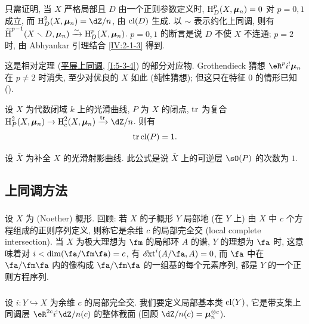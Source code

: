 只需证明, 当 $X$ 严格局部且 $D$ 由一个正则参数定义时,
$\operatorname{H}_D^p(X,{\bm\mu}_n) = 0$ 对 $p=0,1$ 成立,
而 $\h_D^2(X,\dmu_n) = \dZ/n$, 由 $\operatorname{cl}(D)$ 生成.
以 $\sim$ 表示约化上同调, 则有
$\widetilde{\operatorname{H}}^{p-1}(X\smallsetminus D,{\bm\mu}_n)\xrightarrow\sim \operatorname{H}_D^p(X,{\bm\mu}_n)$.
$p=0,1$ 的断言是说 $D$ 不使 $X$ 不连通; $p=2$ 时, 由 Abhyankar 引理结合 \ref{IV:2-1-3} 得到.

这是相对定理 (\hyperref[I]{平展上同调}, \ref{I:5-3-4}) 的部分对应物.
Grothendieck 猜想 $\eR^p i^! \dmu_n$ 在 $p\ne 2$ 时消失,
至少对优良的 $X$ 如此 (纯性猜想); 但这只在特征 $0$ 的情形已知 (\cite[XIX]{sga4}).

\begin{theorem}[基本相容性]\label{IV:2-1-5}
设 $X$ 为代数闭域 $k$ 上的光滑曲线, $P$ 为 $X$ 的闭点,
$\operatorname{tr}$ 为复合 $\h_P^2(X,\dmu_n) \to \h_c^2(X,\dmu_n) \xrightarrow{\tr} \dZ/n$. 则有
\[
  \operatorname{tr} \operatorname{cl}(P) = 1 \text{.}
\]
\end{theorem}

设 $\bar X$ 为补全 $X$ 的光滑射影曲线. 此公式是说 $\bar X$ 上的可逆层 $\sO(P)$ 的次数为 $1$.

\subsection{上同调方法}\label{IV:2-2}

\subsubsection{}\label{IV:2-2-1}

设 $X$ 为 (Noether) 概形. 回顾: 若 $X$ 的子概形 $Y$ 局部地 (在 $Y$ 上)
由 $X$ 中 $c$ 个方程组成的正则序列定义, 则称它是余维 $c$ 的局部完全交 (local complete intersection).
当 $X$ 为极大理想为 $\fm$ 的局部环 $A$ 的谱, $Y$ 的理想为 $\fa$ 时,
这意味着对 $i<\dim(\fa/\fm\fa)=c$, 有 $\Ext^i(A/\fa,A) = 0$,
而 $\fa$ 中在 $\fa/\fm\fa$ 内的像构成 $\fa/\fm\fa$ 的一组基的每个元素序列, 都是 $Y$ 的一个正则方程序列.

\subsubsection{}\label{IV:2-2-2}

设 $i:Y\hookrightarrow X$ 为余维 $c$ 的局部完全交.
我们要定义局部基本类 $\operatorname{cl}(Y)$, 它是带支集上同调层
$\eR^{2c}i^! \dZ/n(c)$ 的整体截面 (回顾 $\dZ/n(c)=\dmu_n^{\otimes c}$).

